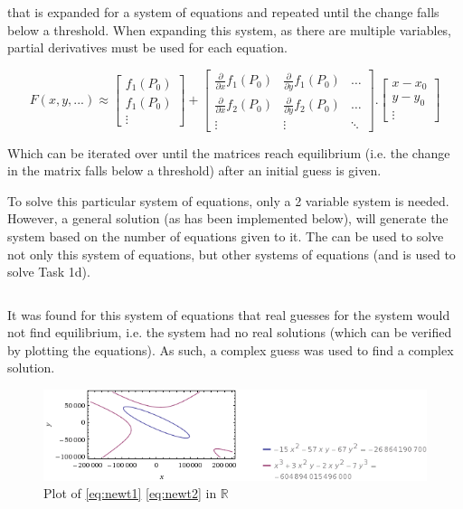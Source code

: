\documentclass[a4paper,11pt,titlepage]{article}
\newcommand{\inputpython}[1]{
    \inputminted[linenos=true, 
                 frame=single, 
                 fontsize=\scriptsize, 
                 label=#1]
                {python}{#1}
}
\begin{document}
that is expanded for a system of equations and repeated until the change 
falls below a threshold. When expanding this system, as there are multiple 
variables, partial derivatives must be used for each equation.

\begin{equation}
F(x,y,...) \approx
\begin{bmatrix}
f_1 (P_0) \\
f_1 (P_0) \\
\vdots
\end{bmatrix}
+
\begin{bmatrix}
    \frac{\partial}{\partial x} f_1 (P_0) & \frac{\partial}{\partial y} f_1 (P_0) &   \ldots \\
    \frac{\partial}{\partial x} f_2 (P_0) & \frac{\partial}{\partial y} f_2 (P_0) &   \ldots \\
    \vdots    &   \vdots     &   \ddots
\end{bmatrix}
.
\begin{bmatrix}
x - x_0 \\
y - y_0 \\
\vdots
\end{bmatrix}
\end{equation}

Which can be iterated over until the matrices reach equilibrium (i.e. the 
change in the matrix falls below a threshold) after an initial guess is given.

To solve this particular system of equations, only a 2 variable system is needed.
However, a general solution (as has been implemented below), will generate the 
system based on the number of equations given to it. The can be used to solve 
not only this system of equations, but other systems of equations (and is used 
to solve Task 1d).

\inputpython{Newtons.py}

It was found for this system of equations that real guesses for the system 
would not find equilibrium, i.e. the system had no real solutions 
(which can be verified by plotting the equations). As such, 
a complex guess was used to find a complex solution.

\begin{figure}[H]
\centering
\includegraphics[scale=0.8]{Task2aplot.png}
\caption{Plot of \eqref{eq:newt1} \eqref{eq:newt2} in $\mathbb{R}$}
\end{figure}
\end{document}
